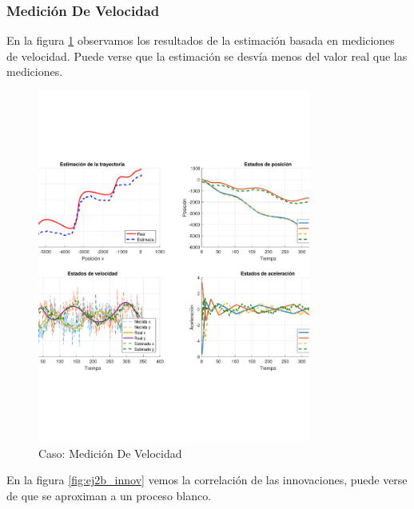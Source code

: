 		\subsubsection{Medición De Velocidad}
		
		En la figura \ref{fig:ej2b} observamos los resultados de la estimación basada en mediciones de velocidad. Puede verse que la estimación se desvía menos del valor real que las mediciones.
		
		\begin{figure}[H]
			\centering
			\includegraphics[width=0.8\textwidth,keepaspectratio]{Figuras/graf_ej2b.pdf}
			\caption{Caso: Medición De Velocidad}
			\label{fig:ej2b}
		\end{figure}
		
		En la figura \ref{fig:ej2b_innov} vemos la correlación de las innovaciones, puede verse de que se aproximan a un proceso blanco.
		
